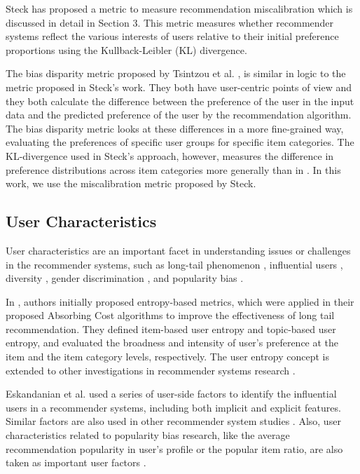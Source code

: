 Steck \cite{steck2018calibrated} has proposed a metric to measure recommendation miscalibration which is discussed in detail in Section 3. This metric measures whether recommender systems reflect the various interests of users relative to their initial preference proportions using the Kullback-Leibler (KL) divergence.

The bias disparity metric proposed by Tsintzou et al. \cite{tsintzou2018bias}, is similar in logic to the metric proposed in Steck's work. They both have user-centric points of view and they both calculate the difference between the preference of the user in the input data and the predicted preference of the user by the recommendation algorithm. The bias disparity metric looks at these differences in a more fine-grained way, evaluating the preferences of specific user groups for specific item categories. The KL-divergence used in Steck's approach, however, measures the difference in preference distributions across item categories more generally than in \cite{tsintzou2018bias}. In this work, we use the miscalibration metric proposed by Steck.

\subsection{User Characteristics}

User characteristics are an important facet in understanding issues or challenges in the recommender systems, such as long-tail phenomenon \cite{yin2012challenging}, influential users \cite{eskandanian2019power}, diversity \cite{eskandanian2017clustering}, gender discrimination \cite{mansoury2020investigating}, and popularity bias \cite{abdollahpouri2019impact}. 

In \cite{yin2012challenging}, authors initially proposed entropy-based metrics, which were applied in their proposed Absorbing Cost algorithms to improve the effectiveness of long tail recommendation. 
They defined item-based user entropy and topic-based user entropy, and evaluated the broadness and intensity of user's preference at the item and the item category levels, respectively. The user entropy concept is extended to other investigations in recommender systems research \cite{eskandanian2017clustering, mansoury2020investigating}. 

Eskandanian et al. \cite{eskandanian2019power} used a series of user-side factors to identify the influential users in a recommender systems, including both implicit and explicit features. Similar factors are also used in other recommender system studies \cite{mansoury2020investigating}. Also, user characteristics related to popularity bias research, like the average recommendation popularity in user's profile or the popular item ratio, are also taken as important user factors \cite{abdollahpouri2019impact}.

